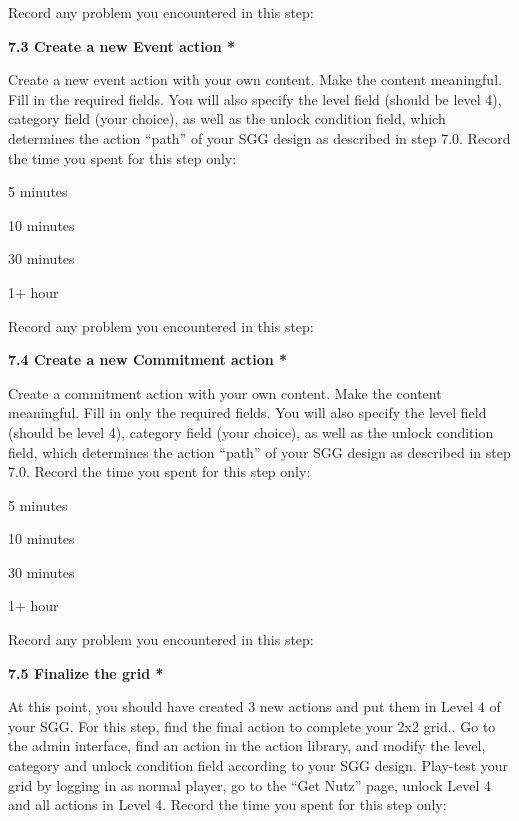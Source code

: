 Record any problem you encountered in this step: \underline{\hspace{4cm}}

{\bf 7.3 Create a new Event action *}

Create a new event action with your own content. Make the content meaningful. Fill in the required fields. You will also specify the level field (should be level 4), category field (your choice), as well as the unlock condition field, which determines the action ``path'' of your SGG design as described in step 7.0. Record the time you spent for this step only:

\begin{radiobutton}
\item 5 minutes
\item  10 minutes
\item  30 minutes
\item  1+ hour
\end{radiobutton}

Record any problem you encountered in this step: \underline{\hspace{4cm}}

{\bf 7.4 Create a new Commitment action *}

Create a commitment action with your own content. Make the content meaningful. Fill in only the required fields. You will also specify the level field (should be level 4), category field (your choice), as well as the unlock condition field, which determines the action ``path'' of your SGG design as described in step 7.0. Record the time you spent for this step only:

\begin{radiobutton}
\item 5 minutes
\item  10 minutes
\item  30 minutes
\item  1+ hour
\end{radiobutton}

Record any problem you encountered in this step: \underline{\hspace{4cm}}

{\bf 7.5 Finalize the grid *}

At this point, you should have created 3 new actions and put them in Level 4 of your SGG. For this step, find the final action to complete your 2x2 grid.. Go to the admin interface, find an action in the action library, and modify the level, category and unlock condition field according to your SGG design. Play-test your grid by logging in as normal player, go to the ``Get Nutz'' page, unlock Level 4 and all actions in Level 4. Record the time you spent for this step only:

